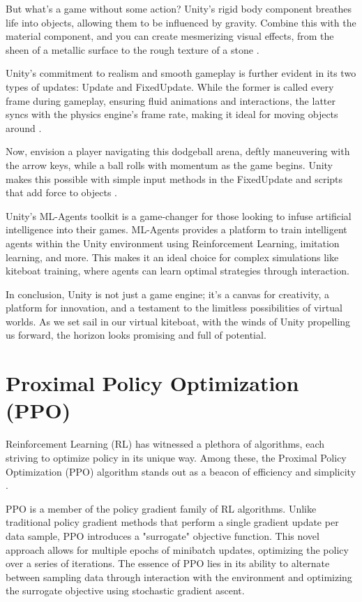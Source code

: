 But what's a game without some action? Unity's rigid body component breathes life into objects, allowing them to be influenced by gravity. Combine this with the material component, and you can create mesmerizing visual effects, from the sheen of a metallic surface to the rough texture of a stone \cite{blackman2012}.

Unity's commitment to realism and smooth gameplay is further evident in its two types of updates: Update and FixedUpdate. While the former is called every frame during gameplay, ensuring fluid animations and interactions, the latter syncs with the physics engine's frame rate, making it ideal for moving objects around \cite{unityupdatefixedupdate}.

Now, envision a player navigating this dodgeball arena, deftly maneuvering with the arrow keys, while a ball rolls with momentum as the game begins. Unity makes this possible with simple input methods in the FixedUpdate and scripts that add force to objects \cite{unityrigidbody}.

Unity's ML-Agents toolkit is a game-changer for those looking to infuse artificial intelligence into their games. ML-Agents provides a platform to train intelligent agents within the Unity environment using Reinforcement Learning, imitation learning, and more. This makes it an ideal choice for complex simulations like kiteboat training, where agents can learn optimal strategies through interaction.

In conclusion, Unity is not just a game engine; it's a canvas for creativity, a platform for innovation, and a testament to the limitless possibilities of virtual worlds. As we set sail in our virtual kiteboat, with the winds of Unity propelling us forward, the horizon looks promising and full of potential.

\section{Proximal Policy Optimization (PPO)}\label{sec:ppo_background}

Reinforcement Learning (RL) has witnessed a plethora of algorithms, each striving to optimize policy in its unique way. Among these, the Proximal Policy Optimization (PPO) algorithm stands out as a beacon of efficiency and simplicity \cite{schulman2017ppo}.

PPO is a member of the policy gradient family of RL algorithms. Unlike traditional policy gradient methods that perform a single gradient update per data sample, PPO introduces a "surrogate" objective function. This novel approach allows for multiple epochs of minibatch updates, optimizing the policy over a series of iterations. The essence of PPO lies in its ability to alternate between sampling data through interaction with the environment and optimizing the surrogate objective using stochastic gradient ascent.

